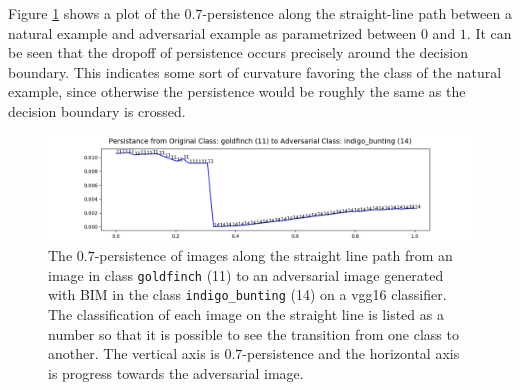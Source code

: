 Figure \ref{fig:persistent_interpimage} shows a plot of the $0.7$-persistence along the straight-line path between a natural example and adversarial example as parametrized between $0$ and $1$. It can be seen that the dropoff of persistence occurs precisely around the decision boundary. This indicates some sort of curvature favoring the class of the natural example, since otherwise the persistence would be roughly the same as the decision boundary is crossed.

\begin{figure}[ht]
\centering
\includegraphics[width = \textwidth]
{c3_figures/persistence_interpolation-IMNET-class-11-vgg16-BIM-48-attack_data-001.png}
\caption{The $0.7$-persistence of images along the straight line path from an image in class \texttt{goldfinch} (11) to an adversarial image generated with BIM in the class \texttt{indigo\_bunting} (14) on a vgg16 classifier. The classification of each image on the straight line is listed as a number so that it is possible to see the transition from one class to another. The vertical axis is $0.7$-persistence and the horizontal axis is progress towards the adversarial image.}\label{fig:persistent_interpimage}
\end{figure}

